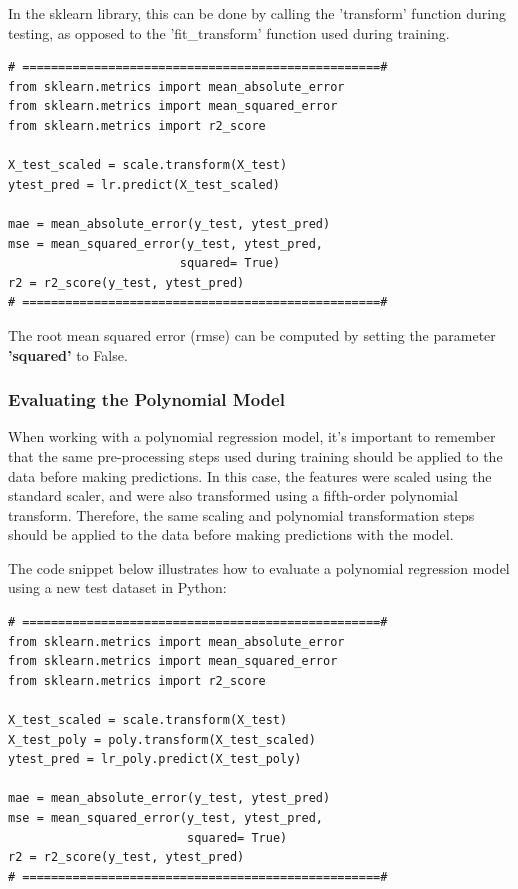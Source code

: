 {In the sklearn library, this can be done by calling the 'transform' function during testing, as opposed to the 'fit\_transform' function used during training.

\begin{lstlisting}
# ==================================================#
from sklearn.metrics import mean_absolute_error
from sklearn.metrics import mean_squared_error
from sklearn.metrics import r2_score

X_test_scaled = scale.transform(X_test)
ytest_pred = lr.predict(X_test_scaled)

mae = mean_absolute_error(y_test, ytest_pred)
mse = mean_squared_error(y_test, ytest_pred,
                        squared= True)
r2 = r2_score(y_test, ytest_pred)
# ==================================================#
\end{lstlisting}
The root mean squared error (rmse) can be computed by setting the parameter \textbf{'squared'} to False.

\subsubsection{\textbf{Evaluating the Polynomial Model}}
When working with a polynomial regression model, it's important to remember that the same pre-processing steps used during training should be applied to the data before making predictions. In this case, the features were scaled using the standard scaler, and were also transformed using a fifth-order polynomial transform. Therefore, the same scaling and polynomial transformation steps should be applied to the data before making predictions with the model.

The code snippet below illustrates how to evaluate a polynomial regression model using a new test dataset in Python:

\begin{lstlisting}
# ==================================================#
from sklearn.metrics import mean_absolute_error
from sklearn.metrics import mean_squared_error
from sklearn.metrics import r2_score

X_test_scaled = scale.transform(X_test)
X_test_poly = poly.transform(X_test_scaled)
ytest_pred = lr_poly.predict(X_test_poly)

mae = mean_absolute_error(y_test, ytest_pred)
mse = mean_squared_error(y_test, ytest_pred,
                         squared= True)
r2 = r2_score(y_test, ytest_pred)
# ==================================================#
\end{lstlisting}


}

